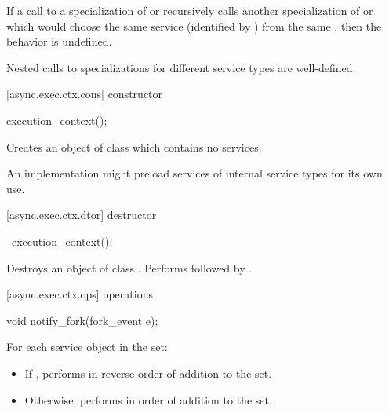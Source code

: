 \pnum
If a call to a specialization of  or 
recursively calls another specialization of  or 
which would choose the same service (identified by ) from the same ,
then the behavior is undefined.
\begin{note}
Nested calls to specializations for different service types are well-defined.
\end{note}

[async.exec.ctx.cons]{ constructor}

%
\begin{itemdecl}
execution_context();
\end{itemdecl}

\begin{itemdescr}
\pnum
\effects Creates an object of class  which contains no services. \begin{note} An implementation might preload services of internal service types for its own use. \end{note}
\end{itemdescr}



[async.exec.ctx.dtor]{ destructor}

%
\begin{itemdecl}
~execution_context();
\end{itemdecl}

\begin{itemdescr}
\pnum
\effects Destroys an object of class . Performs  followed by .
\end{itemdescr}



[async.exec.ctx.ops]{ operations}

%
\begin{itemdecl}
void notify_fork(fork_event e);
\end{itemdecl}

\begin{itemdescr}
\pnum
\effects For each service object  in the set:
\begin{itemize}
\item
 If , performs  in reverse order of addition to the set.
\item
 Otherwise, performs  in order of addition to the set.
\end{itemize}
\end{itemdescr}




